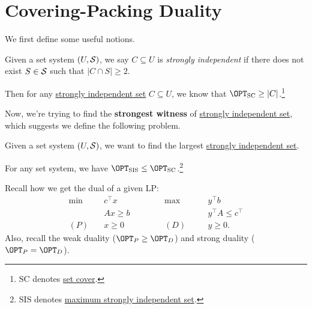 \section{Covering-Packing Duality}
We first define some useful notions.
\begin{definition}\label{def:strongly-independent}
	Given a set system \((U, \mathcal{\MakeUppercase{S}} )\), we say \(C\subseteq U\) is \emph{strongly independent} if there does not exist \(S\in \mathcal{\MakeUppercase{S}} \) such that \(\left\vert C \cap S \right\vert \geq 2\).
\end{definition}

\begin{remark}
	Then for any \hyperref[def:strongly-independent]{strongly independent set} \(C\subseteq U\), we know that \(\OPT_{\mathrm{SC}} \geq \left\vert C \right\vert\).\footnote{\(\mathrm{SC}\) denotes \hyperref[prb:set-cover]{set cover}.}
\end{remark}

Now, we're trying to find the \textbf{strongest witness} of \hyperref[def:strongly-independent]{strongly independent set}, which suggests we define the following problem.

\begin{problem}\label{prb:max-strongly-independent-set}
Given a set system \((U, \mathcal{\MakeUppercase{S}} )\), we want to find the largest \hyperref[def:strongly-independent]{strongly independent set}.
\end{problem}

\begin{remark}
	For any set system, we have \(\OPT_{\mathrm{SIS}}\leq \OPT_{\mathrm{SC}}\).\footnote{\(\mathrm{SIS}\) denotes \hyperref[prb:max-strongly-independent-set]{maximum strongly independent set}.}
\end{remark}

\begin{prev}[LP dual]
	Recall how we get the dual of a given LP:
	\[
		\begin{alignedat}{5}
			\min~&c^{\top}x\qquad\qquad&&\max ~&&y^{\top} b\\
			&Ax \geq b 				&&		&&y^{\top} A\leq c^{\top} \\
			(P)\quad	&x\geq  0 	&&(D)\quad&& y\geq 0.
		\end{alignedat}
	\]
	Also, recall the weak duality (\(\OPT_{P} \geq \OPT_D\)) and strong duality (\(\OPT_P = \OPT_D\)).
\end{prev}

